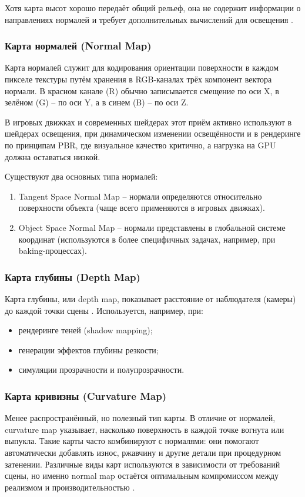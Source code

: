 Хотя карта высот хорошо передаёт общий рельеф, она не содержит информации о направлениях нормалей и требует дополнительных вычислений для освещения \cite{martins2024}.
\subsubsection{Карта нормалей (Normal Map)}

Карта нормалей служит для кодирования ориентации поверхности в каждом пикселе текстуры путём хранения в RGB‑каналах трёх компонент вектора нормали. В красном канале (R) обычно записывается смещение по оси X, в зелёном (G) -- по оси Y, а в синем (B) -- по оси Z. 

В игровых движках и современных шейдерах этот приём активно используют в шейдерах освещения, при динамическом изменении освещённости и в рендеринге по принципам PBR, где визуальное качество критично, а нагрузка на GPU должна оставаться низкой.

Существуют два основных типа нормалей:
\begin{enumerate}
	\item Tangent Space Normal Map -- нормали определяются относительно поверхности объекта (чаще всего применяются в игровых движках).
	\item Object Space Normal Map -- нормали представлены в глобальной системе координат (используются в более специфичных задачах, например, при baking-процессах).
\end{enumerate}
\subsubsection{Карта глубины (Depth Map)}

Карта глубины, или depth map, показывает расстояние от наблюдателя (камеры) до каждой точки сцены \cite{distante2020}. Используется, например, при:
\begin{itemize}
	\item рендеринге теней (shadow mapping);
	\item генерации эффектов глубины резкости;
	\item симуляции прозрачности и полупрозрачности.
\end{itemize}
\subsubsection{Карта кривизны (Curvature Map)}

Менее распространённый, но полезный тип карты. В отличие от нормалей, curvature map указывает, насколько поверхность в каждой точке вогнута или выпукла. Такие карты часто комбинируют с нормалями: они помогают автоматически добавлять износ, ржавчину и другие детали при процедурном затенении. Различные виды карт используются в зависимости от требований сцены, но именно normal map остаётся оптимальным компромиссом между реализмом и производительностью \cite{ansari2024}. 

